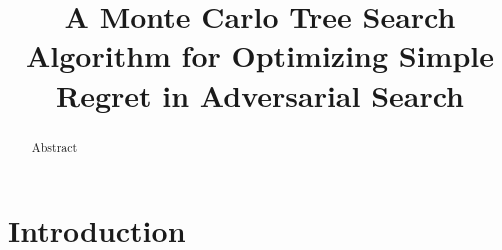 \documentclass[runningheads,a4paper]{llncs}
\begin{document}
\mainmatter  %

\title{A Monte Carlo Tree Search Algorithm for Optimizing Simple Regret in Adversarial Search}

\titlerunning{ }

%
%
\author{ }
%
\authorrunning{ }

% 

\institute{ }


%
%


\maketitle


\begin{abstract}
Abstract
\end{abstract}

\section{Introduction}
\end{document}
